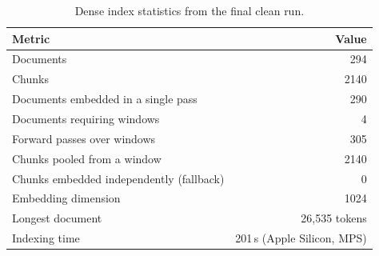 \documentclass[10pt,a4paper]{article}
\begin{document}
\begin{table}[h]
\centering
\small
\begin{tabular}{lr}
\toprule
Metric & Value \\
\midrule
Documents & 294 \\
Chunks & 2140 \\
Documents embedded in a single pass & 290 \\
Documents requiring windows & 4 \\
Forward passes over windows & 305 \\
Chunks pooled from a window & 2140 \\
Chunks embedded independently (fallback) & 0 \\
Embedding dimension & 1024 \\
Longest document & 26{,}535 tokens \\
Indexing time & 201\,s (Apple Silicon, MPS) \\
\bottomrule
\end{tabular}
\caption{Dense index statistics from the final clean run.}
\label{tab:densestats}
\end{table}
\end{document}
